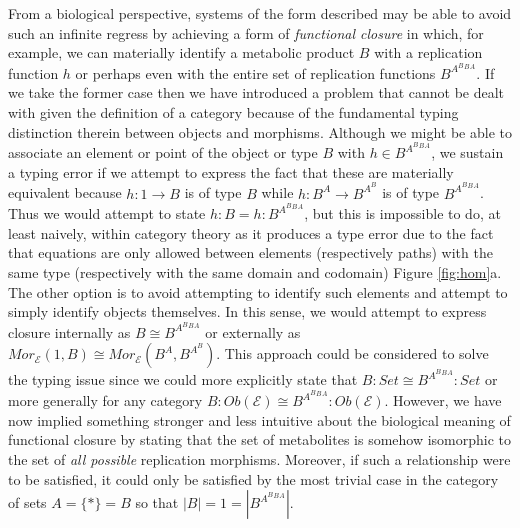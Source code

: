 From a biological perspective, systems of the form described may be able to avoid such an infinite regress by achieving a form of \emph{functional closure} in which, for example, we can materially identify a metabolic product $B$ with a replication function $h$ or perhaps even with the entire set of replication functions $B^{A^B{^B{^A}}}$. If we take the former case then we have introduced a problem that cannot be dealt with given the definition of a category because of the fundamental typing distinction therein between objects and morphisms. Although we might be able to associate an element or point of the object or type $B$ with $h \in B^{A^B{^B{^A}}}$, we sustain a typing error if we attempt to express the fact that these are materially equivalent because $h \colon 1 \rightarrow B$ is of type $B$ while $h \colon B^A \rightarrow B^{A^B}$ is of type $B^{A^B{^B{^A}}}$. Thus we would attempt to state $h:B = h:B^{A^B{^B{^A}}}$, but this is impossible to do, at least naively, within category theory as it produces a type error due to the fact that equations are only allowed between elements (respectively paths) with the same type (respectively with the same domain and codomain) Figure \ref{fig:hom}a. The other option is to avoid attempting to identify such elements and attempt to simply identify objects themselves. In this sense, we would attempt to express closure internally as $B \cong B^{A^B{^B{^A}}}$ or externally as $Mor_{\mathcal{E}}(1,B) \cong Mor_{\mathcal{E}}(B^A,B^{A^B})$. This approach could be considered to solve the typing issue since we could more explicitly state that $B \colon Set \cong B^{A^B{^B{^A}}} \colon Set$ or more generally for any category $B \colon Ob(\mathcal{E}) \cong B^{A^B{^B{^A}}} \colon Ob(\mathcal{E})$. However, we have now implied something stronger and less intuitive about the biological meaning of functional closure by stating that the set of metabolites is somehow isomorphic to the set of \emph{all possible} replication morphisms. Moreover, if such a relationship were to be satisfied, it could only be satisfied by the most trivial case in the category of sets $A = \{*\} = B$ so that $|B|=1=|B^{A^B{^B{^A}}}|$.

